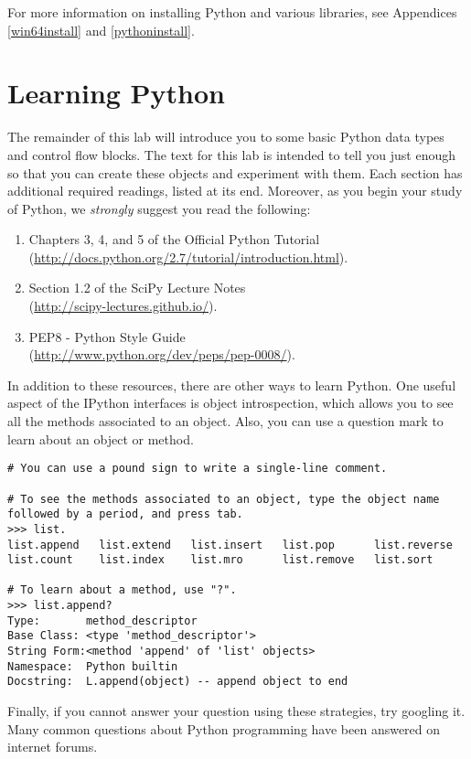 For more information on installing Python and various libraries, see Appendices \ref{win64install} and \ref{pythoninstall}.


\section*{Learning Python}
The remainder of this lab will introduce you to some basic Python data types and control flow blocks. The text for this lab is intended to tell you just enough so that you can create these objects and experiment with them. Each section has additional required readings, listed at its end. Moreover, as you begin your study of Python, we \emph{strongly} suggest you read the following:
\begin{enumerate}
\item Chapters 3, 4, and 5 of the Official Python Tutorial \\
        (\url{http://docs.python.org/2.7/tutorial/introduction.html}).
\item Section 1.2 of the SciPy Lecture Notes\\
        (\url{http://scipy-lectures.github.io/}).
\item PEP8 - Python Style Guide \\
        (\url{http://www.python.org/dev/peps/pep-0008/}).
\end{enumerate}

In addition to these resources, there are other ways to learn Python. One useful aspect of the IPython interfaces is object introspection, which allows you to see all the methods associated to an object. Also, you can use a question mark to learn about an object or method.

\begin{lstlisting}
# You can use a pound sign to write a single-line comment.

# To see the methods associated to an object, type the object name followed by a period, and press tab.
>>> list.
list.append   list.extend   list.insert   list.pop      list.reverse  
list.count    list.index    list.mro      list.remove   list.sort

# To learn about a method, use "?".
>>> list.append?
Type:       method_descriptor
Base Class: <type 'method_descriptor'>
String Form:<method 'append' of 'list' objects>
Namespace:  Python builtin
Docstring:  L.append(object) -- append object to end
\end{lstlisting}

Finally, if you cannot answer your question using these strategies, try googling it. Many common questions about Python programming have been answered on internet forums.

